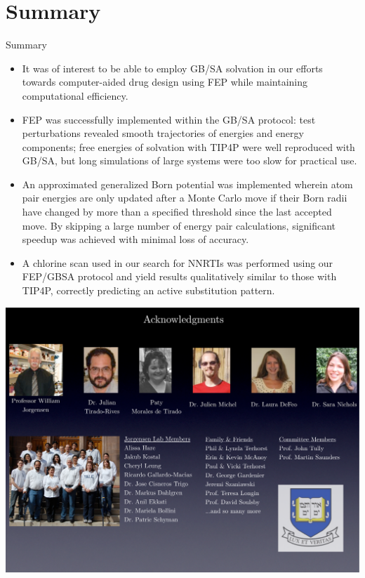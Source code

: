 \documentclass[10pt]{beamer}
\begin{document}

\section{Summary}


\begin{frame}{Summary}

\begin{itemize}
    \item It was of interest to be able to employ GB/SA solvation in our efforts towards computer-aided drug design using FEP while maintaining computational efficiency.
    \item FEP was successfully implemented within the GB/SA protocol: test perturbations revealed smooth trajectories of energies and energy components; free energies of solvation with TIP4P were well reproduced with GB/SA, but long simulations of large systems were too slow for practical use.
    \item An approximated generalized Born potential was implemented wherein atom pair energies are only updated after a Monte Carlo move if their Born radii have changed by more than a specified threshold since the last accepted move. By skipping a large number of energy pair calculations, significant speedup was achieved with minimal loss of accuracy.
    \item A chlorine scan used in our search for NNRTIs was performed using our FEP/GBSA protocol and yield results qualitatively similar to those with TIP4P, correctly predicting an active substitution pattern.
\end{itemize}

\end{frame}

\begin{center}
\hspace*{-.35cm}\includegraphics[scale=0.355]{figures/ack.pdf}
\end{center}
\end{document}
